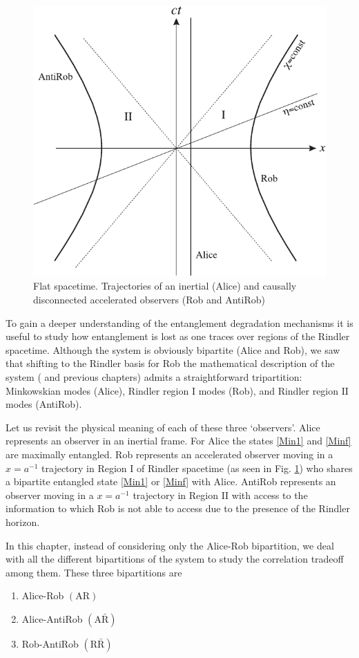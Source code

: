 \begin{figure}[h]
\begin{center}
\includegraphics[width=.80\textwidth]{rar}
\end{center}
\caption{Flat spacetime. Trajectories of an inertial (Alice) and causally disconnected accelerated observers (Rob and AntiRob)}
\label{rar}
\end{figure}

To gain a deeper understanding of the entanglement degradation mechanisms it is useful to study how entanglement is lost as one traces over regions of the Rindler spacetime. Although the system is obviously bipartite (Alice and Rob), we saw that shifting to the Rindler basis for Rob the mathematical description of the system (\cite{Alicefalls,AlsingSchul} and previous chapters) admits a straightforward tripartition: Minkowskian modes (Alice), Rindler region I modes (Rob), and Rindler region $\text{II}$  modes (AntiRob). 

 Let us revisit the physical meaning  of each of
these three `observers'. Alice represents an observer in an inertial frame.
For Alice the states
\eqref{Min1} and \eqref{Minf} are maximally entangled.
Rob represents an accelerated observer moving in a $x=a^{-1}$
trajectory in Region I of Rindler spacetime (as seen in Fig. \ref{rar}) who shares a bipartite entangled state \eqref{Min1} or \eqref{Minf} with Alice.
AntiRob represents an observer  moving in a $x=a^{-1}$ trajectory in
Region II with access to the information to which Rob is not able to
access due to the presence of the Rindler horizon.

In this chapter, instead of considering only the Alice-Rob bipartition, we deal with all the different bipartitions of the system to study the correlation tradeoff among them. These three bipartitions are\begin{enumerate}
\item Alice-Rob $(\text{AR})$
\item Alice-AntiRob $(\text{A}{\bar{\text{R}}})$
\item Rob-AntiRob $(\text{R}{\bar{\text{R}}})$
\end{enumerate}

